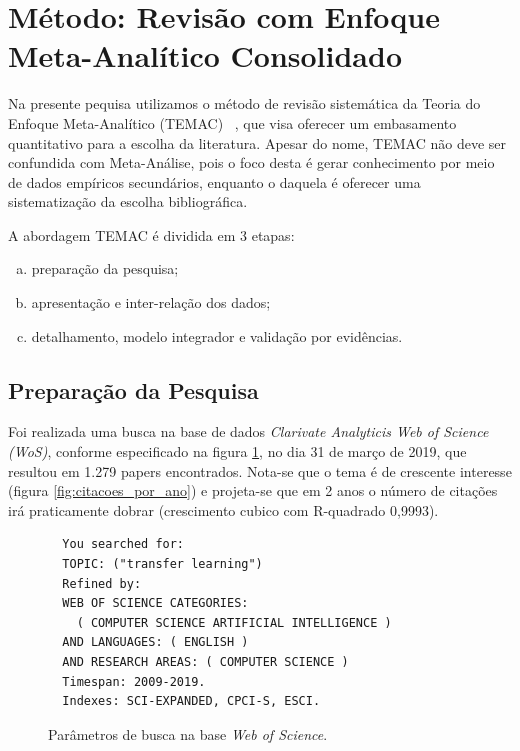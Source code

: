 \documentclass[sigconf]{acmart}
\begin{document}
\section{Método: Revisão com Enfoque Meta-Analítico Consolidado}
Na presente pequisa utilizamos o método de revisão sistemática da Teoria do Enfoque Meta-Analítico (TEMAC) ~\cite{Mariano}, que visa oferecer um embasamento quantitativo para a escolha da literatura. Apesar do nome, TEMAC não deve ser confundida com Meta-Análise, pois o foco desta é gerar conhecimento por meio de dados empíricos secundários, enquanto o daquela é oferecer uma sistematização da escolha bibliográfica.

A abordagem TEMAC é dividida em 3 etapas: 
\begin{enumerate}[a)]
  \item preparação da pesquisa;
  \item apresentação e inter-relação dos dados;
  \item detalhamento, modelo integrador e validação por evidências.
\end{enumerate}

\subsection{Preparação da Pesquisa}
Foi realizada uma busca na base de dados \emph{Clarivate Analyticis Web of Science (WoS)}, conforme especificado na figura \ref{card:wos}, no dia 31 de março de 2019, que resultou em 1.279 papers encontrados. Nota-se que o tema é de crescente interesse (figura \ref{fig:citacoes_por_ano}) e projeta-se que em 2 anos o número de citações irá praticamente dobrar (crescimento cubico com R-quadrado 0,9993).
\begin{figure}[htp]

\begin{tcolorbox}[colback=yellow!5!white,colframe=gray!75!black,title={Results: 1,289 (from Web of Science Core Collection)}]
  \begin{verbatim}
  You searched for: 
  TOPIC: ("transfer learning")
  Refined by: 
  WEB OF SCIENCE CATEGORIES: 
    ( COMPUTER SCIENCE ARTIFICIAL INTELLIGENCE )
  AND LANGUAGES: ( ENGLISH ) 
  AND RESEARCH AREAS: ( COMPUTER SCIENCE )
  Timespan: 2009-2019. 
  Indexes: SCI-EXPANDED, CPCI-S, ESCI.
  \end{verbatim}

\end{tcolorbox}
\caption{Parâmetros de busca na base \emph{Web of Science}.}
\label{card:wos}
\end{figure}
\end{document}
